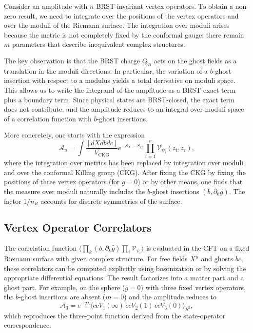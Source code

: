 \documentclass[11pt]{article}
\renewcommand{\tilde}{\widetilde}
\renewcommand{\bar}{\overline}
\begin{document}
Consider an amplitude with $n$ BRST-invariant vertex operators. To obtain a non-zero result, we need to integrate over the positions of the vertex operators and over the moduli of the Riemann surface. The integration over moduli arises because the metric is not completely fixed by the conformal gauge; there remain $m$ parameters that describe inequivalent complex structures.

The key observation is that the BRST charge $Q_B$ acts on the ghost fields as a translation in the moduli directions. In particular, the variation of a $b$-ghost insertion with respect to a modulus yields a total derivative on moduli space. This allows us to write the integrand of the amplitude as a BRST-exact term plus a boundary term. Since physical states are BRST-closed, the exact term does not contribute, and the amplitude reduces to an integral over moduli space of a correlation function with $b$-ghost insertions.

More concretely, one starts with the expression
\begin{equation}
\mathcal{A}_n = \int \frac{[dX db dc]}{V_{\text{CKG}}} e^{-S_X - S_{\text{gh}}} \prod_{i=1}^n \mathcal{V}_{\psi_i}(z_i, \bar{z}_i),
\end{equation}
where the integration over metrics has been replaced by integration over moduli and over the conformal Killing group (CKG). After fixing the CKG by fixing the positions of three vertex operators (for $g=0$) or by other means, one finds that the measure over moduli naturally includes the $b$-ghost insertions $(b, \partial_k \hat{g})$. The factor $1/n_R$ accounts for discrete symmetries of the surface.

\subsection{Vertex Operator Correlators}

The correlation function $\langle \prod_k (b, \partial_k \hat{g}) \prod_i \mathcal{V}_{\psi_i} \rangle$ is evaluated in the CFT on a fixed Riemann surface with given complex structure. For free fields $X^\mu$ and ghosts $bc$, these correlators can be computed explicitly using bosonization or by solving the appropriate differential equations. The result factorizes into a matter part and a ghost part. For example, on the sphere ($g=0$) with three fixed vertex operators, the $b$-ghost insertions are absent ($m=0$) and the amplitude reduces to
\begin{equation}
\mathcal{A}_3 = e^{-2\lambda} \langle c\tilde{c} V_1(\infty) \, c\tilde{c} V_2(1) \, c\tilde{c} V_3(0) \rangle_{S^2},
\end{equation}
which reproduces the three-point function derived from the state-operator correspondence.
\end{document}
